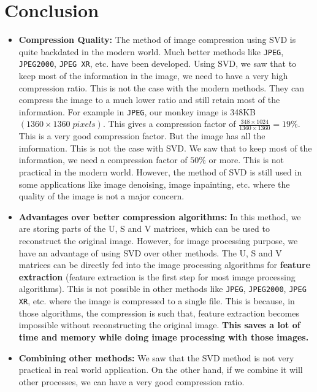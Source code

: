 \section{Conclusion}
	\begin{itemize}
		\item \textbf{Compression Quality:} The method of image compression using SVD is quite backdated in the modern world. Much better methods like \texttt{JPEG}, \texttt{JPEG2000}, \texttt{JPEG XR}, etc. have been developed. Using SVD, we saw that to keep most of the information in the image, we need to have a very high compression ratio. This is not the case with the modern methods. They can compress the image to a much lower ratio and still retain most of the information. For example in \texttt{JPEG}, our monkey image is 348KB $(1360\times1360\;pixels)$. This gives a compression factor of $\frac{348\times1024}{1360\times1360}=19\%$. This is a very good compression factor. But the image has all the imformation. This is not the case with SVD. We saw that to keep most of the information, we need a compression factor of $50\%$ or more. This is not practical in the modern world. However, the method of SVD is still used in some applications like image denoising, image inpainting, etc. where the quality of the image is not a major concern.
		
		\item \textbf{Advantages over better compression algorithms:} In this method, we are storing parts of the U, S and V matrices, which can be used to reconstruct the original image. However, for image processing purpose, we have an advantage of using SVD over other methods. The U, S and V matrices can be directly fed into the image processing algorithms for \textbf{feature extraction} (feature extraction is the first step for most image processing algorithms). This is not possible in other methods like \texttt{JPEG}, \texttt{JPEG2000}, \texttt{JPEG XR}, etc. where the image is compressed to a single file. This is because, in those algorithms, the compression is such that, feature extraction becomes impossible without reconstructing the original image. \textbf{This saves a lot of time and memory while doing image processing with those images.}
		
		\item \textbf{Combining other methods:} We saw that the SVD method is not very practical in real world application. On the other hand, if we combine it will other processes, we can have a very good compression ratio.
	\end{itemize}